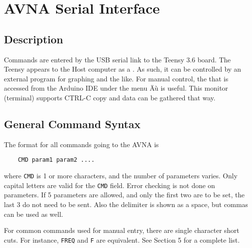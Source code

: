 \section{AVNA Serial Interface}
\label{sect:Ser}   %

\subsection{Description}
\label{subsect:SerDes}
Commands are entered by the USB serial link to the Teensy 3.6 board. The Teensy appears to the Host computer as a . As such, it can be controlled by an external program for graphing and the like.  For manual control, the  that is accessed from the Arduino IDE under the menu Äù is useful.  This monitor (terminal) supports CTRL-C copy and data can be gathered that way.

\subsection{General Command Syntax}
\label{subsect:SerSyn}
The format for all commands going to the AVNA is
\begin{verbatim}
    CMD param1 param2 ....
\end{verbatim}
where \texttt{CMD} is 1 or more characters, and the number of parameters varies.  Only capital letters are valid for the \texttt{CMD} field. Error checking is not done on parameters.  If 5 parameters are allowed, and only the first two are to be set, the last 3 do not need to be sent.  Also the delimiter is shown as a space, but commas can be used as well.

For common commands used for manual entry, there are single character short cuts.  For instance, \texttt{FREQ} and \texttt{F} are equivalent. See Section 5 for a complete list.

